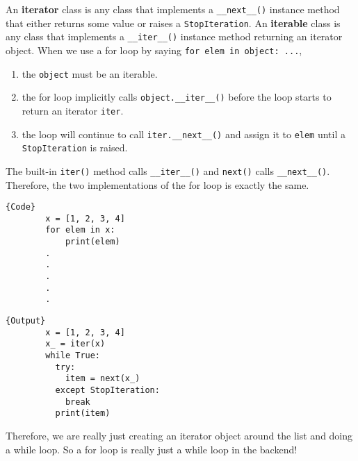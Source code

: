   \begin{definition} 
    An \textbf{iterator} class is any class that implements a \texttt{\_\_next\_\_()} instance method that either returns some value or raises a \texttt{StopIteration}. An \textbf{iterable} class is any class that implements a \texttt{\_\_iter\_\_()} instance method returning an iterator object. When we use a for loop by saying \texttt{for elem in object: ...}, 
    \begin{enumerate}
      \item the \texttt{object} must be an iterable. 
      \item the for loop implicitly calls \texttt{object.\_\_iter\_\_()} before the loop starts to return an iterator \texttt{iter}. 
      \item the loop will continue to call \texttt{iter.\_\_next\_\_()} and assign it to \texttt{elem} until a \texttt{StopIteration} is raised. 
    \end{enumerate}
    The built-in \texttt{iter()} method calls \texttt{\_\_iter\_\_()} and \texttt{next()} calls \texttt{\_\_next\_\_()}. Therefore, the two implementations of the for loop is exactly the same. 

    \noindent\begin{minipage}{.5\textwidth}
      \begin{lstlisting}[]{Code}
        x = [1, 2, 3, 4] 
        for elem in x: 
            print(elem)
        .
        .
        .
        .
        .
      \end{lstlisting}
      \end{minipage}
      \hfill
      \begin{minipage}{.49\textwidth}
      \begin{lstlisting}[]{Output}
        x = [1, 2, 3, 4] 
        x_ = iter(x) 
        while True: 
          try: 
            item = next(x_)
          except StopIteration: 
            break 
          print(item)
      \end{lstlisting}
    \end{minipage}
    Therefore, we are really just creating an iterator object around the list and doing a while loop. So a for loop is really just a while loop in the backend!  
  \end{definition} 

